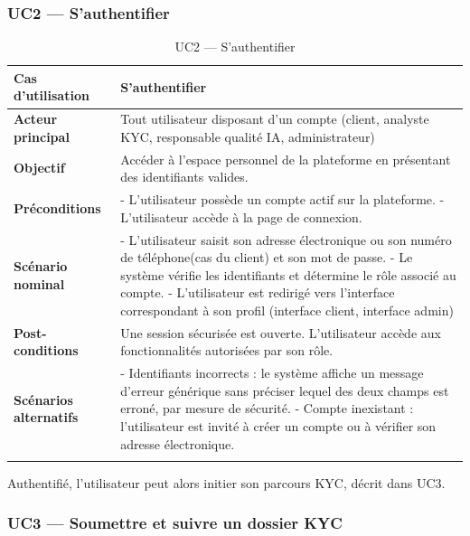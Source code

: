 \subsubsection{UC2 --- S'authentifier}

\begin{longtable}{|>{\bfseries}p{3.8cm}|p{10.2cm}|}
  \hline
  Cas d'utilisation    & S'authentifier \\
  \hline
  Acteur principal     & Tout utilisateur disposant d'un compte (client, analyste KYC, responsable qualité IA, administrateur) \\
  \hline
  Objectif             & Accéder à l'espace personnel de la plateforme en présentant des identifiants valides. \\
  \hline
  Préconditions        &
    - L'utilisateur possède un compte actif sur la plateforme. \newline
    - L'utilisateur accède à la page de connexion. \\
  \hline
  Scénario nominal     &
    - L'utilisateur saisit son adresse électronique ou son numéro de téléphone(cas du client) et son mot de passe. \newline
    - Le système vérifie les identifiants et détermine le rôle associé au compte. \newline
    - L'utilisateur est redirigé vers l'interface correspondant à son profil (interface client, interface admin)\\
  \hline
  Post-conditions      & Une session sécurisée est ouverte. L'utilisateur accède aux fonctionnalités autorisées par son rôle. \\
  \hline
  Scénarios alternatifs &
    - Identifiants incorrects : le système affiche un message d'erreur générique sans préciser lequel des deux champs est erroné, par mesure de sécurité. \newline
    - Compte inexistant : l'utilisateur est invité à créer un compte ou à vérifier son adresse électronique. \\
  \hline
  \caption{UC2 --- S'authentifier}
  \label{tab:uc2}
\end{longtable}

Authentifié, l'utilisateur peut alors initier son parcours KYC, décrit dans UC3.

\subsubsection{UC3 --- Soumettre et suivre un dossier KYC}

